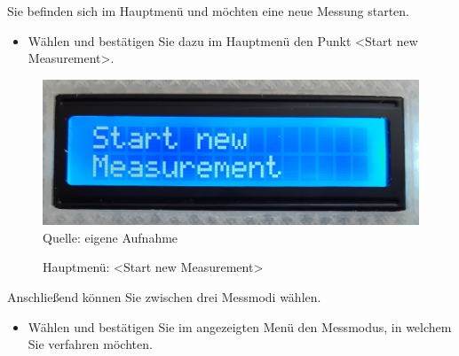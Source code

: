 \label{Durchführung}

Sie befinden sich im Hauptmenü und möchten eine neue Messung starten.
\begin{itemize}
	\item Wählen und bestätigen Sie dazu im Hauptmenü den Punkt <Start new Measurement>.	
\end{itemize}

\begin{figure}[!hbt]
	\centering
	\includegraphics[width=0.3\linewidth]{Images/StartNewMeasurement2}
	\footnotesize \\Quelle: eigene Aufnahme
	\caption{Hauptmenü: <Start new Measurement>}
	\label{fig:startnew}
\end{figure}

Anschließend können Sie zwischen drei Messmodi wählen.
\begin{itemize}
	\item Wählen und bestätigen Sie im angezeigten Menü den Messmodus, in welchem Sie verfahren möchten.	
\end{itemize}

